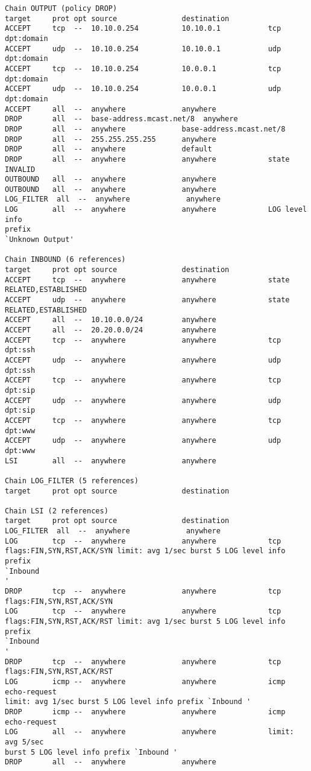 \documentclass[a4paper,12pt]{report}
\newenvironment{myscriptlisting}
{\begin{list}{}{\setlength{\leftmargin}{1em}}\item\scriptsize\bfseries}
{\end{list}}
\begin{document}
\begin{myscriptlisting}
\begin{verbatim}
Chain OUTPUT (policy DROP)
target     prot opt source               destination         
ACCEPT     tcp  --  10.10.0.254          10.10.0.1           tcp dpt:domain 
ACCEPT     udp  --  10.10.0.254          10.10.0.1           udp dpt:domain 
ACCEPT     tcp  --  10.10.0.254          10.0.0.1            tcp dpt:domain 
ACCEPT     udp  --  10.10.0.254          10.0.0.1            udp dpt:domain 
ACCEPT     all  --  anywhere             anywhere            
DROP       all  --  base-address.mcast.net/8  anywhere            
DROP       all  --  anywhere             base-address.mcast.net/8 
DROP       all  --  255.255.255.255      anywhere            
DROP       all  --  anywhere             default             
DROP       all  --  anywhere             anywhere            state INVALID 
OUTBOUND   all  --  anywhere             anywhere            
OUTBOUND   all  --  anywhere             anywhere            
LOG_FILTER  all  --  anywhere             anywhere            
LOG        all  --  anywhere             anywhere            LOG level info
prefix
`Unknown Output' 

Chain INBOUND (6 references)
target     prot opt source               destination         
ACCEPT     tcp  --  anywhere             anywhere            state
RELATED,ESTABLISHED 
ACCEPT     udp  --  anywhere             anywhere            state
RELATED,ESTABLISHED 
ACCEPT     all  --  10.10.0.0/24         anywhere            
ACCEPT     all  --  20.20.0.0/24         anywhere            
ACCEPT     tcp  --  anywhere             anywhere            tcp dpt:ssh 
ACCEPT     udp  --  anywhere             anywhere            udp dpt:ssh 
ACCEPT     tcp  --  anywhere             anywhere            tcp dpt:sip 
ACCEPT     udp  --  anywhere             anywhere            udp dpt:sip 
ACCEPT     tcp  --  anywhere             anywhere            tcp dpt:www 
ACCEPT     udp  --  anywhere             anywhere            udp dpt:www 
LSI        all  --  anywhere             anywhere            

Chain LOG_FILTER (5 references)
target     prot opt source               destination         

Chain LSI (2 references)
target     prot opt source               destination         
LOG_FILTER  all  --  anywhere             anywhere            
LOG        tcp  --  anywhere             anywhere            tcp
flags:FIN,SYN,RST,ACK/SYN limit: avg 1/sec burst 5 LOG level info prefix
`Inbound
' 
DROP       tcp  --  anywhere             anywhere            tcp
flags:FIN,SYN,RST,ACK/SYN 
LOG        tcp  --  anywhere             anywhere            tcp
flags:FIN,SYN,RST,ACK/RST limit: avg 1/sec burst 5 LOG level info prefix
`Inbound
' 
DROP       tcp  --  anywhere             anywhere            tcp
flags:FIN,SYN,RST,ACK/RST 
LOG        icmp --  anywhere             anywhere            icmp echo-request
limit: avg 1/sec burst 5 LOG level info prefix `Inbound ' 
DROP       icmp --  anywhere             anywhere            icmp echo-request 
LOG        all  --  anywhere             anywhere            limit: avg 5/sec
burst 5 LOG level info prefix `Inbound ' 
DROP       all  --  anywhere             anywhere            


\end{verbatim}
\end{myscriptlisting}
\end{document}
